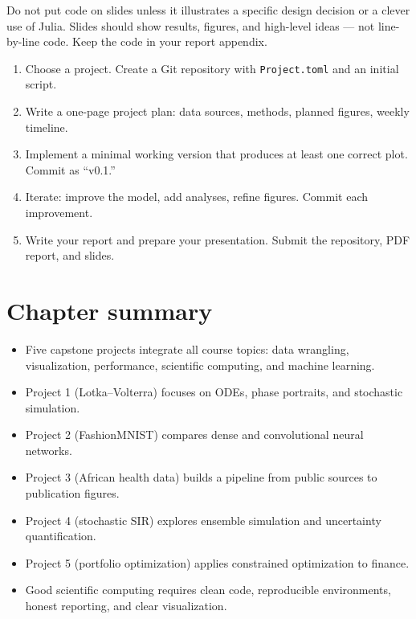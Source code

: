 \begin{warningbox}
Do not put code on slides unless it illustrates a specific design decision or a clever use of Julia. Slides should show results, figures, and high-level ideas --- not line-by-line code. Keep the code in your report appendix.
\end{warningbox}

\begin{exercise}
\begin{enumerate}
  \item Choose a project. Create a Git repository with \texttt{Project.toml} and an initial script.
  \item Write a one-page project plan: data sources, methods, planned figures, weekly timeline.
  \item Implement a minimal working version that produces at least one correct plot. Commit as ``v0.1.''
  \item Iterate: improve the model, add analyses, refine figures. Commit each improvement.
  \item Write your report and prepare your presentation. Submit the repository, PDF report, and slides.
\end{enumerate}
\end{exercise}

\section{Chapter summary}

\begin{itemize}
  \item Five capstone projects integrate all course topics: data wrangling, visualization, performance, scientific computing, and machine learning.
  \item Project 1 (Lotka--Volterra) focuses on ODEs, phase portraits, and stochastic simulation.
  \item Project 2 (FashionMNIST) compares dense and convolutional neural networks.
  \item Project 3 (African health data) builds a pipeline from public sources to publication figures.
  \item Project 4 (stochastic SIR) explores ensemble simulation and uncertainty quantification.
  \item Project 5 (portfolio optimization) applies constrained optimization to finance.
  \item Good scientific computing requires clean code, reproducible environments, honest reporting, and clear visualization.
\end{itemize}
